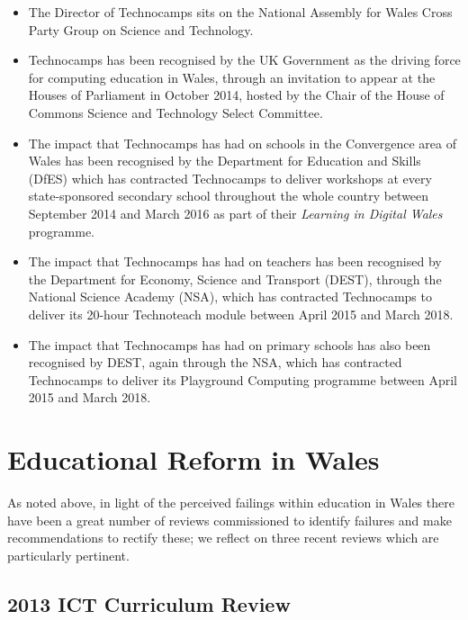\documentclass{sig-alternate}
\begin{document}
\begin{itemize}
\item
The Director of Technocamps sits on
the National Assembly for Wales Cross Party Group on Science and Technology.

\item
Technocamps has been recognised by the UK Government as the driving
force for computing education in Wales, through an invitation to
appear at the Houses of Parliament in October 2014, hosted by the
Chair of the House of Commons Science and Technology Select Committee.

\item
The impact that Technocamps has had on schools in the Convergence area
of Wales has been recognised by the Department for Education and Skills (DfES)
which has contracted Technocamps to deliver workshops at every
state-sponsored secondary school throughout the whole country between
September 2014 and March 2016 as part of their \emph{Learning in
Digital Wales} programme.

\item
The impact that Technocamps has had on teachers has been recognised by
the Department for Economy, Science and Transport (DEST), through the
National Science Academy (NSA), which has contracted Technocamps to deliver
its 20-hour Technoteach module between April 2015 and March 2018.

\item
The impact that Technocamps has had on primary schools has also been
recognised by DEST, again through the NSA, which has contracted
Technocamps to deliver its Playground Computing programme between
April 2015 and March 2018.

\end{itemize}

\section{Educational Reform in Wales}\label{welshedurefom}

As noted above, in light of the perceived failings within education in
Wales there have been a great number of reviews commissioned to
identify failures and make recommendations to rectify these; we
reflect on three recent reviews which are particularly pertinent.

\subsection{2013 ICT Curriculum Review}
\end{document}
